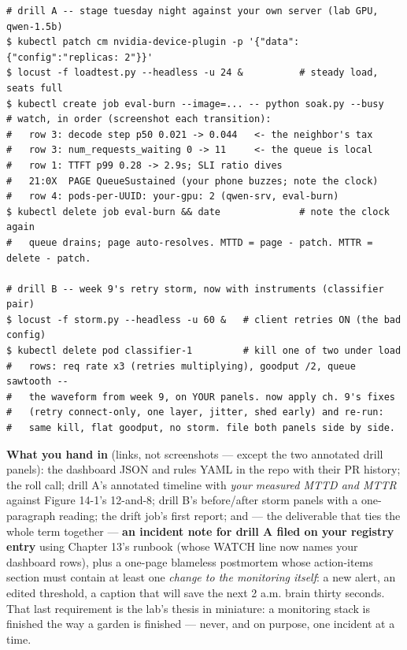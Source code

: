 \begin{terminalbox}
\begin{Verbatim}[breaklines=true,breakanywhere=true,fontsize=\small,formatcom=\color{tbbtermfg},codes=\tbbcodeactive]
# drill A -- stage tuesday night against your own server (lab GPU, qwen-1.5b)
$ kubectl patch cm nvidia-device-plugin -p '{"data":{"config":"replicas: 2"}}'
$ locust -f loadtest.py --headless -u 24 &          # steady load, seats full
$ kubectl create job eval-burn --image=... -- python soak.py --busy
# watch, in order (screenshot each transition):
#   row 3: decode step p50 0.021 -> 0.044   <- the neighbor's tax
#   row 3: num_requests_waiting 0 -> 11     <- the queue is local
#   row 1: TTFT p99 0.28 -> 2.9s; SLI ratio dives
#   21:0X  PAGE QueueSustained (your phone buzzes; note the clock)
#   row 4: pods-per-UUID: your-gpu: 2 (qwen-srv, eval-burn)
$ kubectl delete job eval-burn && date              # note the clock again
#   queue drains; page auto-resolves. MTTD = page - patch. MTTR = delete - patch.

# drill B -- week 9's retry storm, now with instruments (classifier pair)
$ locust -f storm.py --headless -u 60 &   # client retries ON (the bad config)
$ kubectl delete pod classifier-1         # kill one of two under load
#   rows: req rate x3 (retries multiplying), goodput /2, queue sawtooth --
#   the waveform from week 9, on YOUR panels. now apply ch. 9's fixes
#   (retry connect-only, one layer, jitter, shed early) and re-run:
#   same kill, flat goodput, no storm. file both panels side by side.
\end{Verbatim}
\end{terminalbox}

\textbf{What you hand in} (links, not screenshots — except the two annotated drill panels): the dashboard JSON and rules YAML in the repo with their PR history; the  roll call; drill A’s annotated timeline with \textit{your measured MTTD and MTTR} against Figure 14-1’s 12-and-8; drill B’s before/after storm panels with a one-paragraph reading; the drift job’s first report; and — the deliverable that ties the whole term together — \textbf{an incident note for drill A filed on your registry entry} using Chapter 13’s runbook (whose WATCH line now names your dashboard rows), plus a one-page blameless postmortem whose action-items section must contain at least one \textit{change to the monitoring itself}: a new alert, an edited threshold, a caption that will save the next 2 a.m. brain thirty seconds. That last requirement is the lab’s thesis in miniature: a monitoring stack is finished the way a garden is finished — never, and on purpose, one incident at a time.

